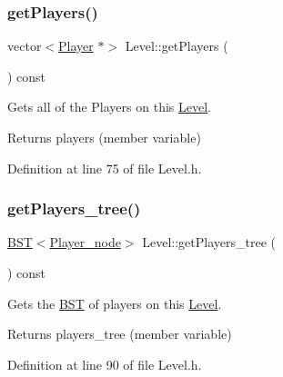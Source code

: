 \hypertarget{class_level_a51ff82259c62111618aed20f96ec9f88}{}\label{class_level_a51ff82259c62111618aed20f96ec9f88} 
\subsubsection{\texorpdfstring{get\+Players()}{getPlayers()}}
{\footnotesize\ttfamily vector$<$\hyperlink{class_player}{Player} $\ast$$>$ Level\+::get\+Players (\begin{DoxyParamCaption}{ }\end{DoxyParamCaption}) const\hspace{0.3cm}{\ttfamily [inline]}}



Gets all of the Players on this \hyperlink{class_level}{Level}. 

\begin{DoxyReturn}{Returns}
players (member variable) 
\end{DoxyReturn}


Definition at line 75 of file Level.\+h.

\hypertarget{class_level_ae24a0ba5c352e1cb0fa64282a89e559f}{}\label{class_level_ae24a0ba5c352e1cb0fa64282a89e559f} 
\subsubsection{\texorpdfstring{get\+Players\+\_\+tree()}{getPlayers\_tree()}}
{\footnotesize\ttfamily \hyperlink{class_b_s_t}{B\+ST}$<$\hyperlink{struct_player__node}{Player\+\_\+node}$>$ Level\+::get\+Players\+\_\+tree (\begin{DoxyParamCaption}{ }\end{DoxyParamCaption}) const\hspace{0.3cm}{\ttfamily [inline]}}



Gets the \hyperlink{class_b_s_t}{B\+ST} of players on this \hyperlink{class_level}{Level}. 

\begin{DoxyReturn}{Returns}
players\+\_\+tree (member variable) 
\end{DoxyReturn}


Definition at line 90 of file Level.\+h.

\hypertarget{class_level_a20beb75d82f194ad901e6193ee728d81}{}\label{class_level_a20beb75d82f194ad901e6193ee728d81} 
